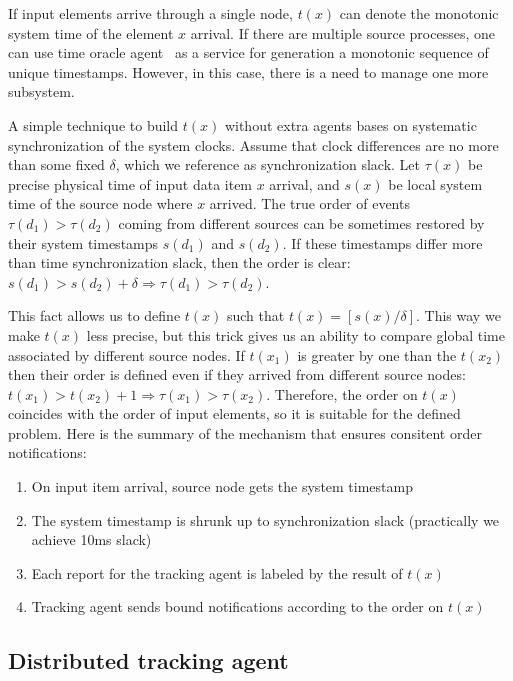 If input elements arrive through a single node, $t(x)$ can denote the monotonic system time of the element $x$ arrival. If there are multiple source processes, one can use time oracle agent~\cite{10.14778/3055330.3055335} as a service for generation a monotonic sequence of unique timestamps. However, in this case, there is a need to manage one more subsystem.

A simple technique to build $t(x)$ without extra agents bases on systematic synchronization of the system clocks. Assume that clock differences are no more than some fixed $\delta$, which we reference as synchronization slack. Let $\tau(x)$ be precise physical time of input data item $x$ arrival, and $s(x)$ be local system time of the source node where $x$ arrived. The true order of events $\tau(d_1) > \tau(d_2)$ coming from different sources can be sometimes restored by their system timestamps $s(d_1)$ and $s(d_2)$. If these timestamps differ more than time synchronization slack, then the order is clear: $s(d_1) > s(d_2) + \delta \Rightarrow \tau(d_1) > \tau(d_2)$.

This fact allows us to define $t(x)$ such that $t(x) = [s(x) / \delta]$. This way we make $t(x)$ less precise, but this trick gives us an ability to compare global time associated by different source nodes. If $t(x_1)$ is greater by one than the $t(x_2)$ then their order is defined even if they arrived from different source nodes:  $t(x_1) > t(x_2) + 1 \Rightarrow \tau(x_1) > \tau(x_2)$. Therefore, the order on $t(x)$ coincides with the order of input elements, so it is suitable for the defined problem. Here is the summary of the mechanism that ensures consitent order notifications:
\begin{enumerate}
    \item On input item arrival, source node gets the system timestamp
    \item The system timestamp is shrunk up to synchronization slack (practically we achieve 10ms slack)
    \item Each report for the tracking agent is labeled by the result of $t(x)$
    \item Tracking agent sends bound notifications according to the order on $t(x)$
\end{enumerate}

\subsection{Distributed tracking agent}

